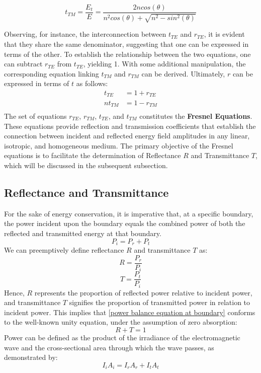 \begin{equation} \label{Transmission Coefficient (TM) without \theta_t}
t_{TM} = \frac{E_t}{E} = \frac{2ncos(\theta)}{n^2cos(\theta) + \sqrt{n^2 - sin^2(\theta)}}
\end{equation}

Observing, for instance, the interconnection between $t_{TE}$ and $r_{TE}$, it is evident that they share the same denominator, suggesting that one can be expressed in terms of the other. To establish the relationship between the two equations, one can subtract $r_{TE}$ from $t_{TE}$, yielding 1. With some additional manipulation, the corresponding equation linking $t_{TM}$ and $r_{TM}$ can be derived. Ultimately, $r$ can be expressed in terms of $t$ as follows:
\begin{align*}
    t_{TE} &= 1 + r_{TE} \\
    nt_{TM} &= 1 - r_{TM} \\
\end{align*}
The set of equations $r_{TE}$, $r_{TM}$, $t_{TE}$, and $t_{TM}$ constitutes the \textbf{Fresnel Equations}. These equations provide reflection and transmission coefficients that establish the connection between incident and reflected energy field amplitudes in any linear, isotropic, and homogeneous medium. The primary objective of the Fresnel equations is to facilitate the determination of Reflectance $R$ and Transmittance $T$, which will be discussed in the subsequent subsection.

\subsection{Reflectance and Transmittance}
For the sake of energy conservation, it is imperative that, at a specific boundary, the power incident upon the boundary equals the combined power of both the reflected and transmitted energy at that boundary.
\begin{equation} \label{power balance equation at boundary}
P_i = P_r + P_t
\end{equation}
We can preemptively define reflectance $R$ and transmittance $T$ as:
\begin{equation} \label{Reflectance}
R = \frac{P_r}{P_i}
\end{equation}
\begin{equation} \label{Transmittance}
T = \frac{P_t}{P_i}
\end{equation}
Hence, $R$ represents the proportion of reflected power relative to incident power, and transmittance $T$ signifies the proportion of transmitted power in relation to incident power. This implies that \ref{power balance equation at boundary} conforms to the well-known unity equation, under the assumption of zero absorption:
\begin{equation} \label{R+T=1}
R + T = 1
\end{equation}
Power can be defined as the product of the irradiance of the electromagnetic wave and the cross-sectional area through which the wave passes, as demonstrated by:
\begin{equation} \label{power balance equation in terms of irradiance}
I_iA_i = I_rA_r + I_tA_t
\end{equation}

